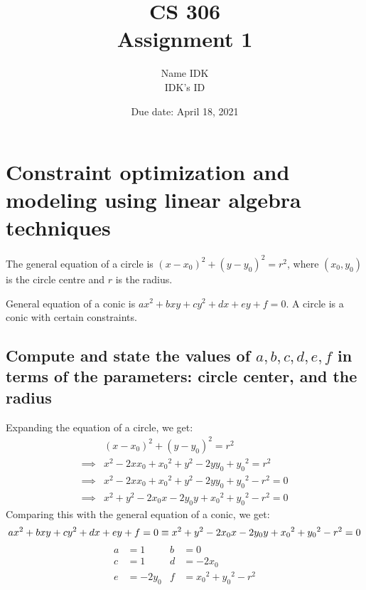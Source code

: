 \documentclass[a4paper]{article}
\title{\textbf{CS 306\\ Assignment 1}}
\author{Name IDK\\IDK's ID}
\date{Due date: April 18, 2021}
\begin{document}
\maketitle

\section{Constraint optimization and modeling using linear algebra techniques}
The general equation of a circle is $(x - x_0)^2 + (y - y_0)^2 = r^2$, where $(x_0, y_0)$ is the circle centre and $r$ is the radius.
\par General equation of a conic is $ax^2 + bxy + cy^2 + dx + ey + f = 0$. A circle is a conic with certain constraints.

\subsection{Compute and state the values of $a, b, c, d, e, f$ in terms of the parameters: circle center, and the radius}
Expanding the equation of a circle, we get:
\begin{align*}
             & (x - x_0)^2 + (y - y_0)^2 = r^2                         \\
    \implies & x^2 - 2xx_0 + {x_0}^2 + y^2 - 2yy_0 + {y_0}^2 = r^2     \\
    \implies & x^2 - 2xx_0 + {x_0}^2 + y^2 - 2yy_0 + {y_0}^2 - r^2 = 0 \\
    \implies & x^2 + y^2 - 2x_0x - 2y_0y + {x_0}^2 + {y_0}^2 - r^2 = 0
\end{align*}
Comparing this with the general equation of a conic, we get:
\begin{equation*}
    \centering
    ax^2 + bxy + cy^2 + dx + ey + f = 0 \equiv x^2 + y^2 - 2x_0x - 2y_0y + {x_0}^2 + {y_0}^2 - r^2 = 0
\end{equation*}
\begin{align*}
    a & = 1    & b & = 0                      \\
    c & = 1    & d & =-2x_0                   \\
    e & =-2y_0 & f & ={x_0}^2 + {y_0}^2 - r^2
\end{align*}
\end{document}
